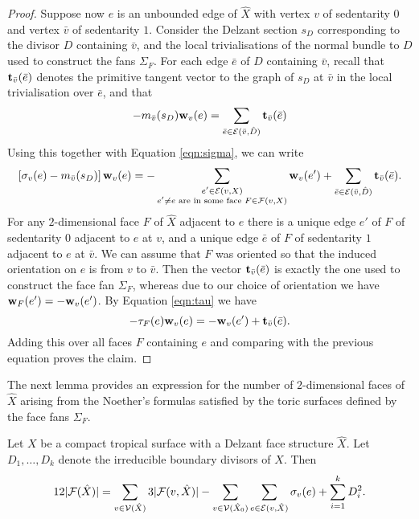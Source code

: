 \begin{proof}
Suppose now $e$ is an unbounded edge of $\hat X$ with vertex $v$ of sedentarity $0$ and vertex $\bar{v}$ of sedentarity $1$.
Consider the Delzant section $s_D$ corresponding to the divisor $D$ containing $\bar v$,
and the local trivialisations of the normal bundle to $D$ used to construct the fans $\Sigma_F$. 
For each edge $\bar e$ of $\hat{D}$ containing $\bar{v}$, recall that ${\bf t}_{\bar{v}}(\bar e)$ denotes the primitive tangent vector to the graph of $s_D$ at $\bar v$ in the local trivialisation over $\bar e$, and that
$$- m_{\bar{v}}(s_D){\bf w}_{v}(e)=  \sum_{\bar{e} \in {\mathcal E}(\bar{v}, \hat{D})} {\bf t}_{\bar{v}}(\bar{e})$$
Using this together with Equation \eqref{eqn:sigma}, we can write
$$[ \sigma_v(e) - m_{\bar{v}}(s_D)]\, {\bf w}_{v}(e) = -  \sum_{\substack{e' \in {{\mathcal E}}(v, X) \\ e' \neq e \text{ are in some face } F \in {{\mathcal F}}(v, X)}} \mathbf w_{v}(e') + \sum_{\bar{e} \in {\mathcal E}(\bar{v}, \hat{D})} {\bf t}_{\bar{v}}(\bar{e}).$$
For any $2$-dimensional face $F$ of $\hat X$ adjacent to $e$ there is a unique edge $e'$ of $F$ of sedentarity $0$ adjacent to $e$ at $v$, and a unique edge $\bar{e}$ of $F$ of sedentarity $1$ adjacent to $e$ at $\bar v$.
We can assume that $F$ was oriented so that the induced orientation on $e$ is from $v$ to $\bar{v}$. 
Then the vector ${\bf t}_{\bar{v}}(\bar{e})$ is exactly the one used to construct the face fan $\Sigma_F$, whereas due to our choice of orientation we have ${\bf w}_F(e') = -\mathbf w_{v}(e')$. 
By Equation \eqref{eqn:tau} we have 
$$- \tau_F(e) {\bf w}_v(e)  = -{\bf w}_v(e')  + {\bf t}_{\bar{v}}(\bar{e}).$$ 
Adding this over all faces $F$ containing $e$ and comparing with the previous equation proves the claim. 
\end{proof}


The next lemma provides an expression for the number of $2$-dimensional faces of $\hat X$
arising from the Noether's formulas satisfied by the toric surfaces defined by the face fans $\Sigma_F$.


\begin{lemma}\label{NoetherToric}
Let $X$ be a compact tropical surface with a Delzant face structure $\hat{X}$.
Let $D_1, \dots, D_k$ denote the irreducible boundary divisors of $X$.
Then 
$$12|{{\mathcal F}}(\hat{X})| = \sum_{v \in {{\mathcal V}}(\hat{X})}  3|{{\mathcal F}}(v, \hat{X})| - \sum_{v \in {{\mathcal V}}(\hat{X}_0)}\sum_{e \in {{\mathcal E}}(v, \hat{X})} \sigma_v(e) + \sum_{i=1}^k D_i^2.$$
\end{lemma}


